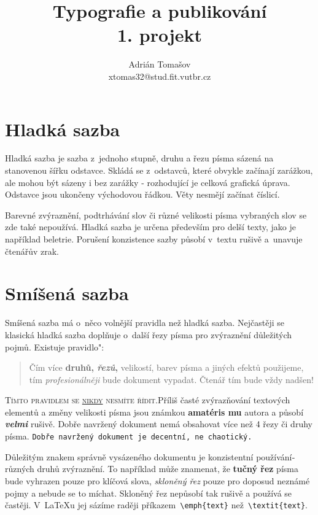 \documentclass[a4paper, twocolumn, 11pt]{article}
\begin{document}
\title{
Typografie a publikování\\
1. projekt}
\author{Adrián Tomašov\\
xtomas32@stud.fit.vutbr.cz}
\date{}
\maketitle


\section{Hladká sazba}
Hladká sazba je sazba z~jednoho stupně, druhu a řezu pí­sma sázená na stanovenou šířku odstavce. Skládá se z~odstavců, které obvykle začínají­ zarážkou, ale mohou být sázeny i bez zarážky - rozhodují­cí­ je celková grafická úprava. Odstavce jsou ukončeny východovou řádkou. Věty nesmějí začínat číslicí.

Barevné zvýraznění­, podtrhávání­ slov či různé velikosti písma vybraných slov se zde také nepoužívá. Hladká sazba je určena především pro delší­ texty, jako je napří­klad beletrie. Porušení­ konzistence sazby působí v~textu rušivě a~unavuje čtenářův zrak.

\section{Smíšená sazba}

Smíšená sazba má o~něco volnější­ pravidla než hladká sazba. Nejčastěji se klasická hladká sazba doplňuje o~další řezy pí­sma pro zvýraznění­ důležitých pojmů. Existuje \quotedblbase pravidlo":
\begin{quotation}
Čí­m ví­ce \textbf{druhů, \emph{řezů},}  {\scriptsize velikostí}, barev pí­sma a jiných efektů použijeme, tí­m \textit{profesionálněji} bude  dokument vypadat. Čtenář tím bude vždy {\Huge nadšen!}
\end{quotation}

\textsc{Tí­mto pravidlem se \underline{nikdy} nesmí­te ří­dit.}\linebreak Příliš časté zvýrazňování textových elementů  a změny velikosti {\tiny pí­sma} jsou {\LARGE známkou} \textbf{\huge amatéris\- mu} autora a působí­ \textbf{\textit {velmi}} rušivě. Dobře navržený dokument nemá obsahovat ví­ce než 4 řezy či druhy pí­sma. {\tt Dobře navržený dokument je decentní­, ne chaotický.}

Důležitým znakem správně vysázeného dokumentu je konzistentní použí­vání­ různých druhů zvýraznění­. To napří­klad může znamenat, že \textbf{ tučný řez} pí­sma bude vyhrazen pouze pro klíčová slova, \emph{skloněný řez} pouze pro doposud neznámé pojmy a nebude se to míchat. Skloněný řez nepůsobí­ tak rušivě a použí­vá se častěji. V~\LaTeX u \space jej sází­me raději pří­kazem\verb! \emph{text}! než\verb! \textit{text}!.
\end{document}
